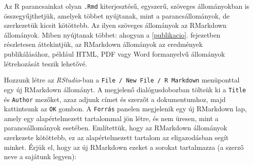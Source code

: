 \documentclass[
]{book}
\newenvironment{Shaded}{\begin{snugshade}}{\end{snugshade}}
\newcommand{\AnnotationTok}[1]{\textcolor[rgb]{0.56,0.35,0.01}{\textbf{\textit{#1}}}}
\newcommand{\CommentTok}[1]{\textcolor[rgb]{0.56,0.35,0.01}{\textit{#1}}}
\newcommand{\InformationTok}[1]{\textcolor[rgb]{0.56,0.35,0.01}{\textbf{\textit{#1}}}}
\newcommand{\NormalTok}[1]{#1}
\begin{document}
Az R parancsainkat olyan \texttt{.Rmd} kiterjesztésű, egyszerű, szöveges állományokban is összegyűjthetjük, amelyek többet nyújtanak, mint a parancsállományok, de szerkezetük kicsit kötöttebb. Az ilyen szöveges állományok az RMarkdown állományok. Miben nyújtanak többet: ahogyan a \ref{publikacio}. fejezetben részletesen áttekintjük, az RMarkdown állományok az eredmények publikálásához, például HTML, PDF vagy Word formanyelvű állományok létrehozását teszik lehetővé.

Hozzunk létre az \emph{RStudio}-ban a \texttt{File\ /\ New\ File\ /\ R\ Markdown} menüponttal egy új RMarkdown állományt. A megjelenő dialógusdobozban töltsük ki a \texttt{Title} és \texttt{Author} mezőket, azaz adjunk címet és szerzőt a dokumentumhoz, majd kattintsunk az \texttt{OK} gombon. A \texttt{Forrás} panelen megjelenik egy új RMarkdown lap, amely egy alapértelmezett tartalommal jön létre, és nem üresen, mint a parancsállományok esetében. Említettük, hogy az RMarkdown állományok szerkezete kötöttebb, ez az alapértelmezett tartalom az eligazodásban segít minket. Érjük el, hogy az új RMarkdown ezeket a sorokat tartalmazza (a szerző neve a sajátunk legyen):

\begin{Shaded}
\end{Shaded}
\end{document}
